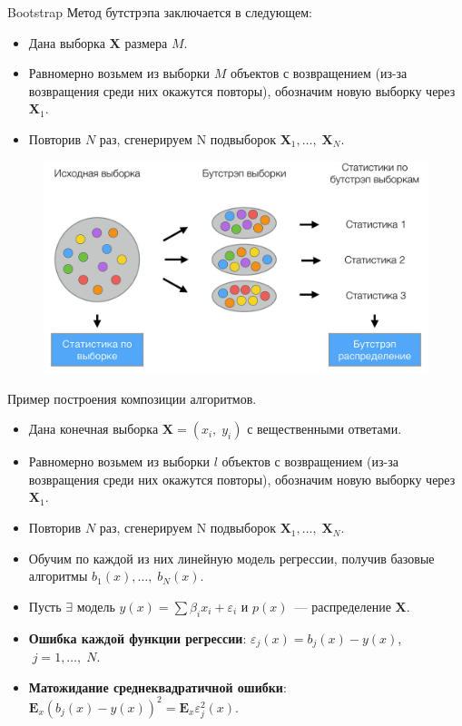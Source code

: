 \documentclass[notheorems, handout]{beamer}
\begin{document}
\begin{frame}{Bootstrap}
  Метод бутстрэпа заключается в следующем:
  \begin{itemize}
    \item Дана выборка $\mathbf{X}$ размера $M$.
    \item Равномерно возьмем из выборки $M$ объектов с возвращением
      (из-за возвращения среди них окажутся повторы), обозначим новую
      выборку через $\mathbf{X}_{1}$.
    \item Повторив $N$ раз, сгенерируем N подвыборок
      $\mathbf{X}_{1}{,} \dots{,}\; \mathbf{X}_{N}$.
  \end{itemize}
  \par\smallskip
  \begin{figure}[h!]
    \includegraphics[width=0.7 \textwidth]{img/bootstrap}
  \end{figure}
\end{frame}

\begin{frame}{Пример построения композиции алгоритмов.}
  \begin{itemize}
    \item Дана конечная выборка $\mathbf{X} = (x_{i}{,}\;y_{i})$ с
      вещественными ответами.
    \item Равномерно возьмем из выборки $l$ объектов с возвращением
      (из-за возвращения среди них окажутся повторы), обозначим новую
      выборку через $\mathbf{X}_{1}$.
    \item Повторив $N$ раз, сгенерируем N подвыборок
      $\mathbf{X}_{1}{,} \dots{,}\; \mathbf{X}_{N}$.
    \item Обучим по каждой из  них линейную модель регрессии, получив
      базовые алгоритмы $b_{1}(x), \dots,\; b_{N}(x)$.
    \item Пусть $\exists$ модель $y(x) = \displaystyle\sum
      \beta_{i}x_{i} + \varepsilon_{i}$ и $p(x)$~--- распределение $\mathbf{X}$.
    \item \textbf{Ошибка каждой функции регрессии}:
      $\varepsilon_{j}(x) = b_{j}(x) - y(x)$, $\;j = 1, \dots,\;N$.
    \item \textbf{Матожидание среднеквадратичной ошибки}:
      $\mathbf{E}_{x}{(b_{j}(x) - y(x))}^{2} =
      \mathbf{E}_{x}\varepsilon_{j}^{2}(x)$.
  \end{itemize}
\end{frame}
\end{document}
